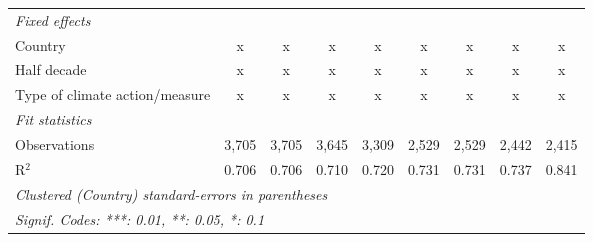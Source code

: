 \begin{table}[htbp]
\begin{tabular}{lcccccccc}
      \emph{Fixed effects}\\
      Country                                                                            & x       & x       & x           & x       & x           & x            & x            & x\\  
      Half decade                                                                        & x       & x       & x           & x       & x           & x            & x            & x\\  
      Type of climate action/measure                                                     & x       & x       & x           & x       & x           & x            & x            & x\\  
      \midrule \emph{Fit statistics}\\
      Observations                                                                       & 3,705   & 3,705   & 3,645       & 3,309   & 2,529       & 2,529        & 2,442        & 2,415\\  
      R$^2$                                                                              & 0.706   & 0.706   & 0.710       & 0.720   & 0.731       & 0.731        & 0.737        & 0.841\\  
      \midrule
      \multicolumn{9}{l}{\emph{Clustered (Country) standard-errors in parentheses}}\\
      \multicolumn{9}{l}{\emph{Signif. Codes: ***: 0.01, **: 0.05, *: 0.1}}\\
   \end{tabular}
\end{table}


